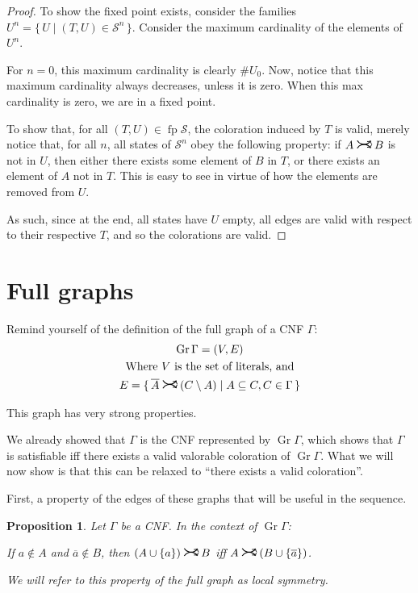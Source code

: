 \documentclass[11pt]{article}
\newcommand{\conj}[1]{\overline{#1}}
\newcommand{\cS}{\mathcal{S}}
\DeclareMathOperator{\Gr}{Gr}
\DeclareMathOperator{\fp}{fp}
\newcommand{\rightcurvearrow}{
\mathrel{
  \begin{tikzpicture}[scale=0.8]
    \draw[thick,->] (0,1ex) arc (30:150:-2ex);
    \draw[thick,->] (0,-1ex) arc (150:30:2ex);
  \end{tikzpicture}
}
}
\newtheorem{prop}{Proposition}
\begin{document}
\begin{proof}
To show the fixed point exists, consider the families $U^n = \{\,U\mid (T,U) \in \cS^n\,\}$. Consider the maximum cardinality of the elements of $U^n$.

For $n = 0$, this maximum cardinality is clearly $\# U_0$. Now, notice that this maximum cardinality always decreases, unless it is zero. When this max cardinality is zero, we are in a fixed point.

To show that, for all $(T,U) \in \fp \cS$, the coloration induced by $T$ is valid, merely notice that, for all $n$, all states of $\cS^n$ obey the following property: if $A \rightcurvearrow B$ is not in $U$, then either there exists some element of $B$ in $T$, or there exists an element of $A$ not in $T$. This is easy to see in virtue of how the elements are removed from $U$.

As such, since at the end, all states have $U$ empty, all edges are valid with respect to their respective $T$, and so the colorations are valid.

\end{proof}

\section{Full graphs}

Remind yourself of the definition of the full graph of a CNF $\Gamma$:
\begin{gather*}
\Gr \Gamma = (V,E) \\
\text{Where $V$ is the set of literals, and}\\
E = \{ \, \conj A \rightcurvearrow (C \setminus A) \mid A \subseteq C, C \in \Gamma \, \}
\end{gather*}

This graph has very strong properties.

We already showed that $\Gamma$ is the CNF represented by $\Gr \Gamma$, which shows that $\Gamma$ is satisfiable iff there exists a valid valorable coloration of $\Gr \Gamma$. What we will now show is that this can be relaxed to ``there exists a valid coloration''.

First, a property of the edges of these graphs that will be useful in the sequence.

\begin{prop}
Let $\Gamma$ be a CNF. In the context of $\Gr \Gamma$:

If $a \not\in A$ and $\conj a \not\in B$, then $(A \cup \{a\}) \rightcurvearrow B$ iff $A \rightcurvearrow (B \cup \{\conj a\})$.

We will refer to this property of the full graph as \emph{local symmetry}.
\end{prop}
\end{document}
